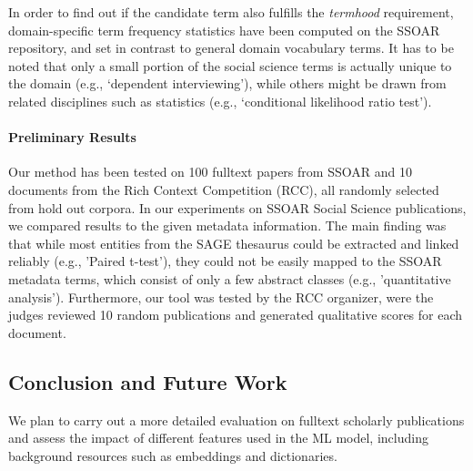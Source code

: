 In order to find out if the candidate term also fulfills the \textit{termhood} requirement, domain-specific term frequency statistics have been computed on the SSOAR repository, and set in contrast to general domain vocabulary terms. 
It has to be noted  that only a small portion of the social science terms is actually unique to the domain (e.g.,  `dependent interviewing'), while others might be drawn from related disciplines such as statistics (e.g., `conditional likelihood ratio test').


\paragraph{Preliminary Results}%
Our method has been tested on 100 fulltext papers from SSOAR and 10 documents from the Rich Context Competition (RCC), all randomly selected from hold out corpora.
In our experiments on SSOAR Social Science publications, we compared results to the given metadata information.
The main finding was that while most entities from the SAGE thesaurus could be extracted and linked reliably (e.g., 'Paired t-test'), they could not be easily mapped to the SSOAR metadata terms, which consist of only a few abstract classes (e.g., 'quantitative analysis'). Furthermore, our tool was tested by the RCC organizer, were the judges reviewed 10 random publications and generated qualitative scores for each document.  %

\subsection{Conclusion and Future Work}
\label{subsec:ner-conclusion}
We plan to carry out a more detailed evaluation on fulltext scholarly publications and assess the impact of different features used in the ML model, including  background resources such as embeddings and dictionaries. 
